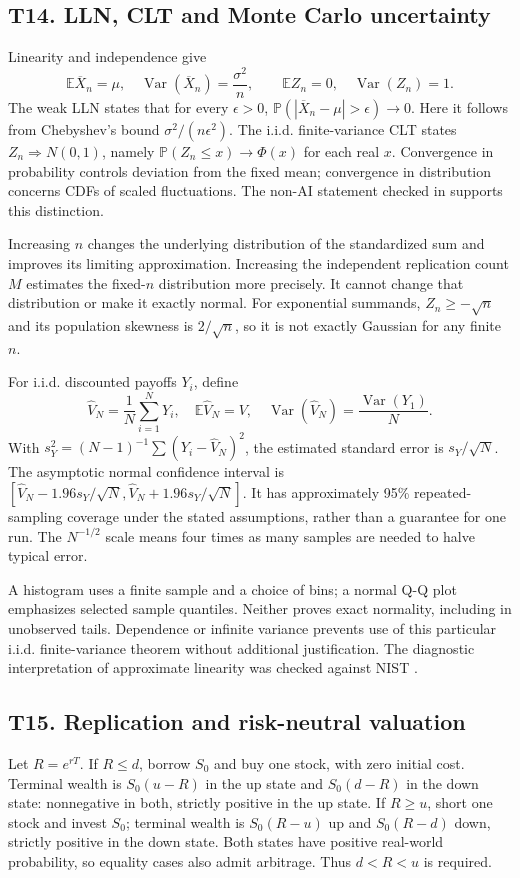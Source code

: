 \documentclass[11pt,a4paper]{article}
\newcommand{\E}{\mathbb E}\newcommand{\Pp}{\mathbb P}
\DeclareMathOperator{\Var}{Var}\DeclareMathOperator{\Cov}{Cov}
\begin{document}
\subsection{T14. LLN, CLT and Monte Carlo uncertainty}
Linearity and independence give
\[
\E\overline X_n=\mu,\quad \Var(\overline X_n)=\frac{\sigma^2}n,
\qquad \E Z_n=0,\quad \Var(Z_n)=1.
\]
The weak LLN states that for every $\epsilon>0$,
$\Pp(|\overline X_n-\mu|>\epsilon)\to0$. Here it follows from Chebyshev's bound $\sigma^2/(n\epsilon^2)$. The i.i.d. finite-variance CLT states $Z_n\Rightarrow N(0,1)$, namely $\Pp(Z_n\leq x)\to\Phi(x)$ for each real $x$. Convergence in probability controls deviation from the fixed mean; convergence in distribution concerns CDFs of scaled fluctuations. The non-AI statement checked in \cite{clt} supports this distinction.

Increasing $n$ changes the underlying distribution of the standardized sum and improves its limiting approximation. Increasing the independent replication count $M$ estimates the fixed-$n$ distribution more precisely. It cannot change that distribution or make it exactly normal. For exponential summands, $Z_n\geq-\sqrt n$ and its population skewness is $2/\sqrt n$, so it is not exactly Gaussian for any finite $n$.

For i.i.d. discounted payoffs $Y_i$, define
\[
\widehat V_N=\frac1N\sum_{i=1}^NY_i,\quad
\E\widehat V_N=V,\quad
\Var(\widehat V_N)=\frac{\Var(Y_1)}N.
\]
With $s_Y^2=(N-1)^{-1}\sum(Y_i-\widehat V_N)^2$, the estimated standard error is $s_Y/\sqrt N$. The asymptotic normal confidence interval is
$[\widehat V_N-1.96s_Y/\sqrt N,\widehat V_N+1.96s_Y/\sqrt N]$.
It has approximately 95\% repeated-sampling coverage under the stated assumptions, rather than a guarantee for one run. The $N^{-1/2}$ scale means four times as many samples are needed to halve typical error.

A histogram uses a finite sample and a choice of bins; a normal Q-Q plot emphasizes selected sample quantiles. Neither proves exact normality, including in unobserved tails. Dependence or infinite variance prevents use of this particular i.i.d. finite-variance theorem without additional justification. The diagnostic interpretation of approximate linearity was checked against NIST \cite{qq}.

\subsection{T15. Replication and risk-neutral valuation}
Let $R=e^{rT}$. If $R\leq d$, borrow $S_0$ and buy one stock, with zero initial cost. Terminal wealth is $S_0(u-R)$ in the up state and $S_0(d-R)$ in the down state: nonnegative in both, strictly positive in the up state. If $R\geq u$, short one stock and invest $S_0$; terminal wealth is $S_0(R-u)$ up and $S_0(R-d)$ down, strictly positive in the down state. Both states have positive real-world probability, so equality cases also admit arbitrage. Thus $d<R<u$ is required.
\end{document}
